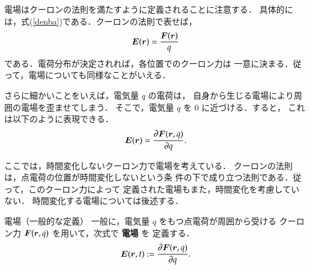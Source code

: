             電場はクーロンの法則を満たすように定義されることに注意する．
            具体的には，式(\ref{denba})である．クーロンの法則で表せば，
                \begin{align}
                    \boldsymbol{E}(\boldsymbol{r})=\frac{\boldsymbol{F}(\boldsymbol{r})}{q}
                \end{align}
            である．電荷分布が決定されれば，各位置でのクーロン力は
            一意に決まる．従って，電場についても同様なことがいえる．

            さらに細かいことをいえば，電気量 $q$ の電荷は，
            自身から生じる電場により周囲の電場を歪ませてしまう．
            そこで，電気量 $q$ を 0 に近づける．すると，
            これは以下のように表現できる．
                \begin{align*}
                    \boldsymbol{E}(\boldsymbol{r})=\frac{\partial\boldsymbol{F}(\boldsymbol{r},q)}{\partial q}.
                \end{align*}

            ここでは，時間変化しないクーロン力で電場を考えている．
            クーロンの法則は，点電荷の位置が時間変化しないという条
            件の下で成り立つ法則である．従って，このクーロン力によって
            定義された電場もまた，時間変化を考慮していない．
            時間変化する電場については後述する．
                \begin{myshadebox}{電場（一般的な定義）}
                一般に，電気量 $q$ をもつ点電荷が周囲から受ける
                クーロン力 $\boldsymbol{F}(\boldsymbol{r},q)$ を用いて，次式で \textbf{電場} を
                定義する．
                    \begin{align}\label{denba_teigi}
                        \bE(\br, t)
                        :=\frac{\rd\bF(\br,q)}{\rd q}.
                    \end{align}
                \end{myshadebox}


